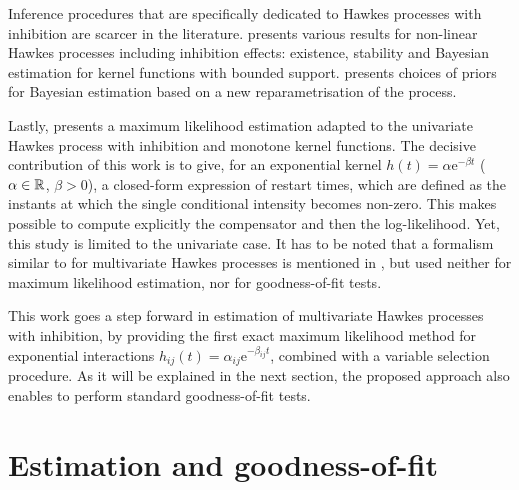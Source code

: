     Inference procedures that are specifically dedicated to Hawkes processes with inhibition are scarcer in the literature. \textcite{Sulem2024} presents various results for non-linear Hawkes processes including inhibition effects: existence, stability and Bayesian estimation for kernel functions with bounded support.
    \textcite{Deutsch2022} presents choices of priors for Bayesian estimation based on a new reparametrisation of the process.

    Lastly, \textcite{bonnet2021} presents a maximum likelihood estimation adapted to the univariate Hawkes process with inhibition and monotone kernel functions.
    The decisive contribution of this work is to give, for an exponential kernel \(h(t) = \alpha \mathrm{e}^{-\beta t}\) (\(\alpha \in {\mathbb R}\), \(\beta>0\)), a closed-form expression of restart times, which are defined as the instants at which the single conditional intensity becomes non-zero.
    This makes possible to compute explicitly the compensator and then the log-likelihood.
    Yet, this study is limited to the univariate case.
    It has to be noted that a formalism similar to \textcite{bonnet2021} for multivariate Hawkes processes is mentioned in \textcite{Deutsch2022},
    but used neither for maximum likelihood estimation, nor for goodness-of-fit tests.

    This work goes a step forward in estimation of multivariate Hawkes processes with inhibition, by providing the first exact maximum likelihood method for exponential interactions $h_{ij}(t) = \alpha_{ij}\mathrm{e}^{-\beta_{ij}t}$, combined with a variable selection procedure.
    As it will be explained in the next section, the proposed approach also enables to perform standard goodness-of-fit tests.

    \section{Estimation and goodness-of-fit}\label{sec:chap3_exponential}

